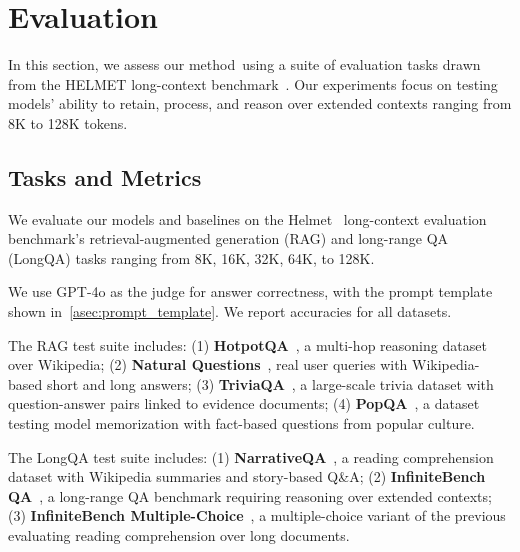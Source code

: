 \section{Evaluation}
\label{sec:evaluation}





% 
% 
% 



In this section, we assess our method~\method using a suite of evaluation tasks drawn from the HELMET long-context benchmark~\cite{yen2024helmet}. Our experiments focus on testing models’ ability to retain, process, and reason over extended contexts ranging from 8K to 128K tokens.

\subsection{Tasks and Metrics}
We evaluate our models and baselines on the Helmet~\cite{yen2024helmet} long-context evaluation benchmark's retrieval-augmented generation (RAG) and long-range QA (LongQA) tasks ranging from 8K, 16K, 32K, 64K, to 128K.

We use GPT-4o as the judge for answer correctness, with the prompt template shown in~\cref{asec:prompt_template}. 
We report accuracies for all datasets.


The RAG test suite includes: 
(1) \textbf{HotpotQA}~\cite{yang-etal-2018-hotpotqa}, a multi-hop reasoning dataset over Wikipedia; 
(2) \textbf{Natural Questions}~\cite{kwiatkowski2019natural}, real user queries with Wikipedia-based short and long answers; 
(3) \textbf{TriviaQA}~\cite{JoshiTriviaQA2017}, a large-scale trivia dataset with question-answer pairs linked to evidence documents; 
(4) \textbf{PopQA}~\cite{mallen2023llm_memorization}, a dataset testing model memorization with fact-based questions from popular culture.

The LongQA test suite includes: 
(1) \textbf{NarrativeQA}~\cite{kocisky-etal-2018-narrativeqa}, a reading comprehension dataset with Wikipedia summaries and story-based Q\&A; 
(2) \textbf{InfiniteBench QA}~\cite{zhang-etal-2024-bench}, a long-range QA benchmark requiring reasoning over extended contexts; 
(3) \textbf{InfiniteBench Multiple-Choice}~\cite{zhang-etal-2024-bench}, a multiple-choice variant of the previous evaluating reading comprehension over long documents.

